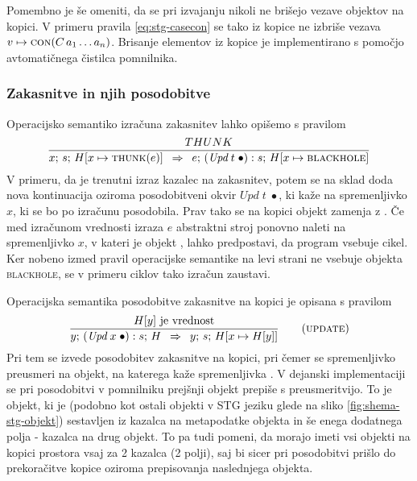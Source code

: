 Pomembno je še omeniti, da se pri izvajanju nikoli ne brišejo vezave objektov na kopici. V primeru pravila \ref{eq:stg-casecon} se tako iz kopice ne izbriše vezava $v \mapsto \textsc{con}(C \, a_1 \dots a_n)$. Brisanje elementov iz kopice je implementirano s pomočjo avtomatičnega čistilca pomnilnika.

\subsubsection{Zakasnitve in njih posodobitve}

Operacijsko semantiko izračuna zakasnitev lahko opišemo s pravilom
\begin{equation}	
\infer{THUNK}{
	x; \, s; \, H[x \mapsto \textsc{thunk}(e)]
}{
	e; \, (\textit{Upd} \; t \; \bullet) : s; \, H[x \mapsto \textsc{blackhole}]
}
\label{eq:stg-thunk}
\end{equation}
V primeru, da je trenutni izraz kazalec na zakasnitev, potem se na sklad doda nova kontinuacija oziroma posodobitveni okvir $\textit{Upd} \; t \; \bullet$, ki kaže na spremenljivko $x$, ki se bo po izračunu posodobila. Prav tako se na kopici objekt zamenja z . Če med izračunom vrednosti izraza $e$ abstraktni stroj ponovno naleti na spremenljivko $x$, v kateri je objekt , lahko predpostavi, da program vsebuje cikel. Ker nobeno izmed pravil operacijske semantike na levi strani ne vsebuje objekta \textsc{blackhole}, se v primeru ciklov tako izračun zaustavi.

Operacijska semantika posodobitve zakasnitve na kopici je opisana s pravilom
\begin{equation*}
\infer[update]{
	\text{$H[y]$ je vrednost}
}{
	y; \, (\textit{Upd} \; x \; \bullet) : s; \, H
}{
	y; \, s; \, H[x \mapsto H[y] ]
}
\label{eq:stg-update}
\end{equation*}
Pri tem se izvede posodobitev zakasnitve na kopici, pri čemer se spremenljivko  preusmeri na objekt, na katerega kaže spremenljivka . V dejanski implementaciji se pri posodobitvi v pomnilniku prejšnji ob\-je\-kt prepiše s preusmeritvijo. To je objekt, ki je (podobno kot ostali objekti v STG jeziku glede na sliko \ref{fig:shema-stg-objekt}) sestavljen iz kazalca na metapodatke objekta in še enega dodatnega polja - kazalca na drug objekt. To pa tudi pomeni, da morajo imeti vsi objekti na kopici prostora vsaj za 2 kazalca (2 polji), saj bi sicer pri posodobitvi prišlo do prekoračitve kopice oziroma prepisovanja naslednjega objekta.

